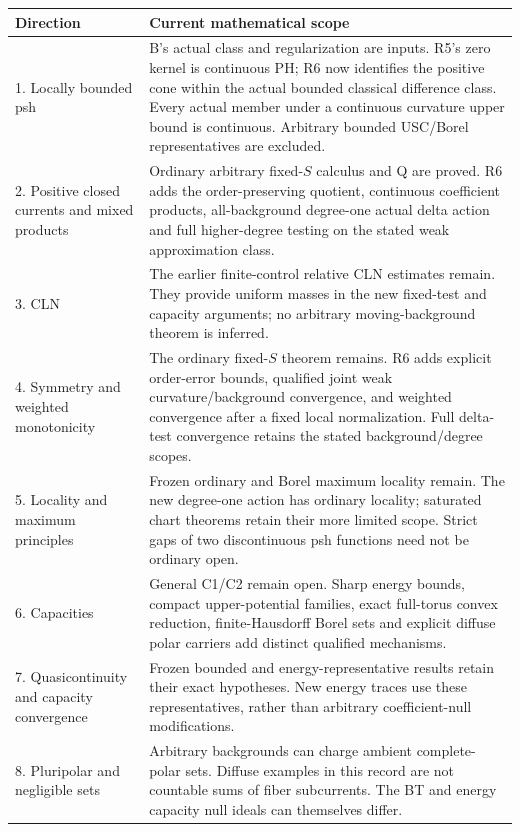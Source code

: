 \documentclass[11pt,a4paper]{article}
\numberwithin{equation}{section}
\theoremstyle{definition}
\theoremstyle{remark}
\begin{document}
\begin{longtable}{@{}p{}p{}@{}}
\toprule
Direction & Current mathematical scope\\
\midrule
\endhead
1. Locally bounded psh & B's actual class and regularization are
inputs. R5's zero kernel is continuous PH; R6 now identifies the
positive cone within the actual bounded classical difference class.
Every actual member under a continuous curvature upper bound is
continuous. Arbitrary bounded USC/Borel representatives are excluded.\\
2. Positive closed currents and mixed products & Ordinary arbitrary
fixed-$S$ calculus and Q are proved. R6 adds the order-preserving
quotient, continuous coefficient products, all-background degree-one
actual delta action and full higher-degree testing on the stated
weak approximation class.\\
3. CLN & The earlier finite-control relative CLN estimates remain.
They provide uniform masses in the new fixed-test and capacity
arguments; no arbitrary moving-background theorem is inferred.\\
4. Symmetry and weighted monotonicity & The ordinary fixed-$S$ theorem remains. R6 adds explicit order-error
bounds, qualified joint weak curvature/background convergence, and
weighted convergence after a fixed local normalization. Full delta-test
convergence retains the stated background/degree scopes.\\
5. Locality and maximum principles & Frozen ordinary and Borel
maximum locality remain. The new degree-one action has ordinary
locality; saturated chart theorems retain their more limited scope.
Strict gaps of two discontinuous psh functions need not be ordinary
open.\\
6. Capacities & General C1/C2 remain open. Sharp energy bounds, compact upper-potential
families, exact full-torus convex reduction, finite-Hausdorff Borel sets
and explicit diffuse polar carriers add distinct qualified mechanisms.\\
7. Quasicontinuity and capacity convergence & Frozen bounded and
energy-representative results retain their exact hypotheses. New
energy traces use these representatives, rather than arbitrary
coefficient-null modifications.\\
8. Pluripolar and negligible sets & Arbitrary backgrounds can charge
ambient complete-polar sets. Diffuse examples in this record are
not countable sums of fiber subcurrents. The BT and energy capacity
null ideals can themselves differ.\\

\end{longtable}
\end{document}
